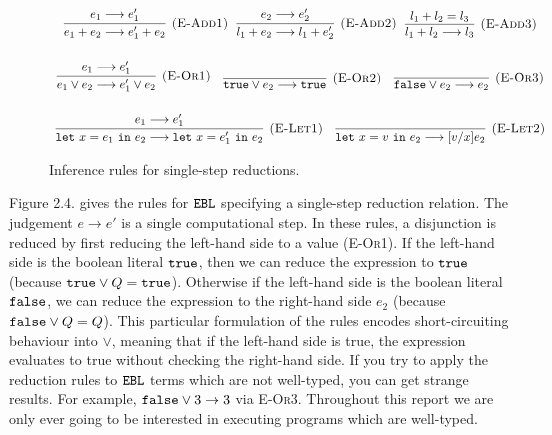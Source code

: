 \begin{figure}[h]

\noindent
{}

\[
\begin{array}{c}

\infer[\textsc{(E-Add1)}]
	{e_1 + e_2 \longrightarrow e_1' + e_2}
	{e_1 \longrightarrow e_1'}
~~
\infer[\textsc{(E-Add2)}]
	{l_1 + e_2 \longrightarrow l_1 + e_2'}
	{e_2 \longrightarrow e_2'}
~~
\infer[\textsc{(E-Add3)}]
	{l_1 + l_2 \longrightarrow l_3}
	{l_1 + l_2 = l_3} \\[4ex]

\infer[\textsc{(E-Or1)}]
	{e_1 \lor e_2 \longrightarrow e_1' \lor e_2}
	{e_1 \longrightarrow e_1'}
	~~~
\infer[\textsc{(E-Or2)}]
	{\true \lor e_2 \longrightarrow \true}
	{}
	~~~
\infer[\textsc{(E-Or3)}]
	{\false \lor e_2 \longrightarrow e_2}
	{}\\[4ex]
	
\infer[\textsc{(E-Let1)}]
	{\letxpr{x}{e_1}{e_2} \longrightarrow \letxpr{x}{e_1'}{e_2}}
	{e_1 \longrightarrow e_1'}
	~~~
\infer[\textsc{(E-Let2)}]
	{\letxpr{x}{v}{e_2} \longrightarrow [v/x]e_2}
	{}

\end{array}
\]


\vspace{-12pt}
\caption{Inference rules for single-step reductions.}
\label{A sample. }
\end{figure}

Figure 2.4. gives the rules for $\mathtt{EBL}$ specifying a single-step reduction relation. The judgement $e \longrightarrow e'$ is a single computational step. In these rules, a disjunction is reduced by first reducing the left-hand side to a value (\textsc{E-Or1}). If the left-hand side is the boolean literal $\mathtt{true}$, then we can reduce the expression to $\mathtt{true}$ (because $\mathtt{true} \lor Q = \mathtt{true}$). Otherwise if the left-hand side is the boolean literal $\mathtt{false}$, we can reduce the expression to the right-hand side $e_2$ (because $\mathtt{false} \lor Q = Q$). This particular formulation of the rules encodes short-circuiting behaviour into $\lor$, meaning that if the left-hand side is true, the expression evaluates to true without checking the right-hand side. If you try to apply the reduction rules to $\mathtt{EBL}$ terms which are not well-typed, you can get strange results. For example, $\mathtt{false} \lor 3 \rightarrow 3$ via \textsc{E-Or3}. Throughout this report we are only ever going to be interested in executing programs which are well-typed.


